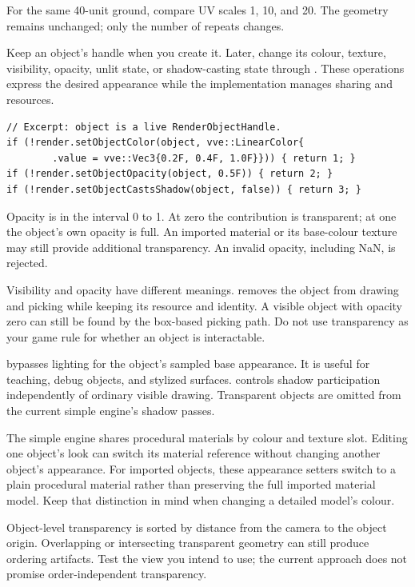 \documentclass[11pt,a4paper]{article}
\begin{document}
\begin{tryit}For the same 40-unit ground, compare UV scales 1, 10, and 20. The geometry remains unchanged; only the number of repeats changes.\end{tryit}

Keep an object's handle when you create it. Later, change its colour, texture, visibility, opacity, unlit state, or shadow-casting state through . These operations express the desired appearance while the implementation manages sharing and resources.
\begin{lstlisting}
// Excerpt: object is a live RenderObjectHandle.
if (!render.setObjectColor(object, vve::LinearColor{
        .value = vve::Vec3{0.2F, 0.4F, 1.0F}})) { return 1; }
if (!render.setObjectOpacity(object, 0.5F)) { return 2; }
if (!render.setObjectCastsShadow(object, false)) { return 3; }
\end{lstlisting}
Opacity is in the interval 0 to 1. At zero the contribution is transparent; at one the object's own opacity is full. An imported material or its base-colour texture may still provide additional transparency. An invalid opacity, including NaN, is rejected.

Visibility and opacity have different meanings.  removes the object from drawing and picking while keeping its resource and identity. A visible object with opacity zero can still be found by the box-based picking path. Do not use transparency as your game rule for whether an object is interactable.

 bypasses lighting for the object's sampled base appearance. It is useful for teaching, debug objects, and stylized surfaces.  controls shadow participation independently of ordinary visible drawing. Transparent objects are omitted from the current simple engine's shadow passes.

The simple engine shares procedural materials by colour and texture slot. Editing one object's look can switch its material reference without changing another object's appearance. For imported objects, these appearance setters switch to a plain procedural material rather than preserving the full imported material model. Keep that distinction in mind when changing a detailed model's colour.

Object-level transparency is sorted by distance from the camera to the object origin. Overlapping or intersecting transparent geometry can still produce ordering artifacts. Test the view you intend to use; the current approach does not promise order-independent transparency.
\end{document}
